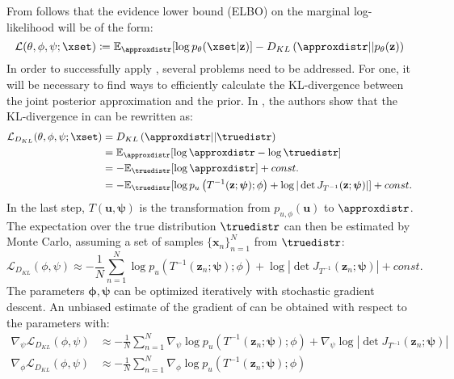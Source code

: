 \documentclass[english]{scrartcl}
\begin{document}
    From  follows that the evidence lower bound (ELBO) on the marginal log-likelihood will be of the form:
    \begin{equation}
        \label{eq:elbo}
        \mathcal{L}(\theta, \phi, \psi; \xset) \coloneqq \mathbb{E}_{\approxdistr}[\log p_{\theta}(\xset|\textbf{z})] - D_{KL} \left( \approxdistr ||p_{\theta}(\textbf{z})\right)
    \end{equation}
    In order to successfully apply , several problems need to be addressed.
    For one, it will be necessary to find ways to efficiently calculate the KL-divergence between the joint posterior approximation and the prior.
    In \citet{papamakarios_normalizing_2019}, the authors show that the KL-divergence in  can be rewritten as:
    \begin{equation}
        \begin{split}
            \mathcal{L}_{D_{KL}}(\theta, \phi, \psi; \xset) & =D_{KL} \left( \approxdistr || \truedistr \right)\\
            & = \mathbb{E}_{\approxdistr}[\log \approxdistr - \log \truedistr]\\
            & = - \mathbb{E}_{\truedistr}[\log \approxdistr] + const.\\
            & =  - \mathbb{E}_{\truedistr}[\log p_u \left( T^{-1}(\textbf{z};\boldsymbol{\psi});\phi \right) + \log |\det J_{T^{-1}}(\textbf{z}; \boldsymbol{\psi})|] + const.
        \end{split}
    \end{equation}
    In the last step, $T(\textbf{u},\boldsymbol{\psi})$ is the transformation from $p_{u,\phi}(\textbf{u})$ to $\approxdistr$.
    The expectation over the true distribution $\truedistr$ can then be estimated by Monte Carlo, assuming a set of samples $\{\textbf{x}_n\}^N_{n=1}$ from $\truedistr$:
    \begin{equation}
        \label{eq:Dkl}
        \mathcal{L}_{D_{KL}}(\phi, \psi) \approx - \frac{1}{N} \sum ^N _{n=1} \log p_u \left( T^{-1}(\textbf{z}_n;\boldsymbol{\psi});\phi \right) + \log |\det J_{T^{-1}}(\textbf{z}{_n}; \boldsymbol{\psi})| + const.
    \end{equation}
    The parameters $\boldsymbol{\phi}, \boldsymbol{\psi}$ can be optimized iteratively with stochastic gradient descent.
    An unbiased estimate of the gradient of  can be obtained with respect to the parameters with:
    \begin{subequations}
        \begin{align}
            \nabla _{\psi} \mathcal{L}_{D_{KL}}(\phi, \psi) & \approx - \frac{1}{N} \sum ^N _{n=1} \nabla _{\psi} \log p_u \left( T^{-1}(\textbf{z}_n;\boldsymbol{\psi});\phi \right) +  \nabla _{\psi}\log |\det J_{T^{-1}}(\textbf{z}_n; \boldsymbol{\psi})|\\
            \nabla _{\phi} \mathcal{L}_{D_{KL}}(\phi, \psi) & \approx - \frac{1}{N} \sum ^N _{n=1} \nabla _{\phi} \log p_u \left( T^{-1}(\textbf{z}_n;\boldsymbol{\psi});\phi \right)
        \end{align}
    \end{subequations}
\end{document}
